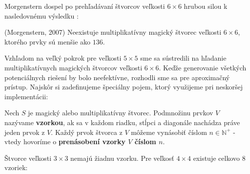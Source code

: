 Morgenstern dospel po prehľadávaní štvorcov veľkosti $6 \times 6$ hrubou silou k nasledovnému výsledku \cite{multimagie}:

\begin{theorem} (Morgenstern, 2007) Neexistuje multiplikatívny magický štvorec veľkosti $6 \times 6$, ktorého prvky sú menšie ako $136$.
\end{theorem}

Vzhľadom na veľký pokrok pre veľkosti $5 \times 5$ sme sa sústredili na hľadanie multiplikatívnych magických štvorcov veľkosti $6 \times 6$. Keďže generovanie všetkých potenciálnych riešení by bolo neefektívne, rozhodli sme sa pre aproximačný prístup. Najskôr si zadefinujeme špeciálny pojem, ktorý využijeme pri neskoršej implementácii:

\begin{definition} Nech $S$ je magický alebo multiplikatívny štvorec. Podmnožinu prvkov $V$ nazývame \textbf{vzorkou}, ak sa v každom riadku, stĺpci a diagonále nachádza práve jeden prvok z $V$. Každý prvok štvorca z $V$ môžeme vynásobiť číslom $n \in \mathbb{N^+}$ - vtedy hovoríme o \textbf{prenásobení vzorky $V$ číslom $n$}.
\end{definition}

Štvorce veľkosti $3 \times 3$ nemajú žiadnu vzorku. Pre veľkosť $4 \times 4$ existuje celkovo $8$ vzoriek: 

